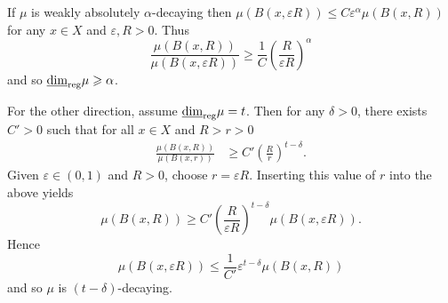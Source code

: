 	If $\mu$ is weakly absolutely $\alpha$-decaying then $\mu(B(x,\varepsilon R)) \le C \varepsilon^{\alpha} \mu(B(x,R))$ for any $x\in X$ and $\varepsilon, R >0$. Thus
	\[
	\frac{\mu(B(x,R))}{\mu(B(x,\varepsilon R))} \ge \frac{1}{C} \left(\frac{R}{\varepsilon R} \right)^{\alpha}
	\]
	and so $\underline{\dim}_{\textup{reg}} \mu \geqslant \alpha$.
	
	For the other direction, assume $\underline{\dim}_{\textup{reg}} \mu = t$. Then for any $\delta > 0$, there exists $C' > 0$ such that for all $x\in X$ and $R>r>0$ 
	\begin{align*}
	\frac{\mu(B(x,R))}{\mu(B(x,r))} &\ge C' \left( \frac{R}{r}\right)^{t - \delta}.
	\end{align*}
	Given $\varepsilon \in (0,1)$ and $R > 0$, choose $r = \varepsilon R$. Inserting this value of $r$ into the above yields 
	\[\mu(B(x,R)) \ge C' \left(\frac{R}{\varepsilon R}\right)^{t-\delta} \mu(B(x,\varepsilon R)).
	\]
	Hence
	\[
	\mu(B(x,\varepsilon R)) \le \frac{1}{C'} \varepsilon^{t - \delta} \mu(B(x,R))  
	\]
	and so $\mu$ is $(t-\delta)$-decaying.




